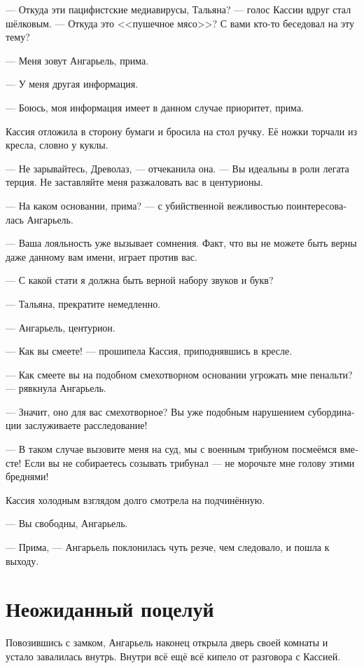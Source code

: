 \documentclass[a4paper,12pt,fleqn]{book}\usepackage{cooltooltips}\usepackage{polyglossia}\setdefaultlanguage[babelshorthands=true]{russian}\setotherlanguage{english}\defaultfontfeatures{Ligatures=TeX,Mapping=tex-text} \usepackage{xcolor}\definecolor{lightgray}{HTML}{bbbbbb}\color{lightgray}\newcommand{\ml}[3]{\textenglish{\textcolor{black}{#3}}}
\begin{document}
--- Откуда эти пацифистские медиавирусы, Тальяна? --- голос Кассии вдруг стал шёлковым.
--- Откуда это <<пушечное мясо>>?
С вами кто-то беседовал на эту тему?

--- Меня зовут Ангарьель, прима.

--- У меня другая информация.

--- Боюсь, моя информация имеет в данном случае приоритет, прима.

Кассия отложила в сторону бумаги и бросила на стол ручку.
Её ножки торчали из кресла, словно у куклы.

--- Не зарывайтесь, Древолаз, --- отчеканила она.
--- Вы идеальны в роли легата терция.
Не заставляйте меня разжаловать вас в центурионы.

--- На каком основании, прима? --- с убийственной вежливостью поинтересовалась Ангарьель.

--- Ваша лояльность уже вызывает сомнения.
Факт, что вы не можете быть верны даже данному вам имени, играет против вас.

--- С какой стати я должна быть верной набору звуков и букв?

--- Тальяна, прекратите немедленно.

--- Ангарьель, центурион.

--- Как вы смеете! --- прошипела Кассия, приподнявшись в кресле.

--- Как смеете вы на подобном смехотворном основании угрожать мне пенальти? --- рявкнула Ангарьель.

--- Значит, оно для вас смехотворное?
Вы уже подобным нарушением субординации заслуживаете расследование!

--- В таком случае вызовите меня на суд, мы с военным трибуном посмеёмся вместе!
Если вы не собираетесь созывать трибунал --- не морочьте мне голову этими бреднями!

Кассия холодным взглядом долго смотрела на подчинённую.

--- Вы свободны, Ангарьель.

--- Прима, --- Ангарьель поклонилась чуть резче, чем следовало, и пошла к выходу.

\section{Неожиданный поцелуй}

Повозившись с замком, Ангарьель наконец открыла дверь своей комнаты и устало завалилась внутрь.
Внутри всё ещё всё кипело от разговора с Кассией.
\end{document}

